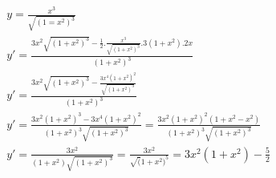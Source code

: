 \begin{ex}
\begin{align}
&y=\frac{x^3}{\sqrt{(1=x^2)^3}}\nonumber\\
&y'=\frac{3x^2\sqrt{(1+x^2)^3}-\frac{1}{2}.\frac{x^3}{\sqrt{(1+x^2)^3}}.3(1+x^2).2x}{(1+x^2)^3}\nonumber\\
&y'=\frac{3x^2\sqrt{(1+x^2)^3}-\frac{3x^4(1+x^2)^2}{\sqrt{(1+x^2)^3}}}{(1+x^2)^3}\nonumber\\
&y'=\frac{3x^2(1+x^2)^3-3x^4(1+x^2)^2}{(1+x^2)^3\sqrt{(1+x^2)^3}}=\frac{3x^2(1+x^2)^2(1+x^2-x^2)}{(1+x^2)^3\sqrt{(1+x^2)^3}}\nonumber\\
&y'=\frac{3x^2}{(1+x^2)\sqrt{(1+x^2)^3}}=\frac{3x^2}{\sqrt(1+x^2)^5}=3x^2(1+x^2)-\frac{5}{2}\nonumber
\end{align}
\end{ex}